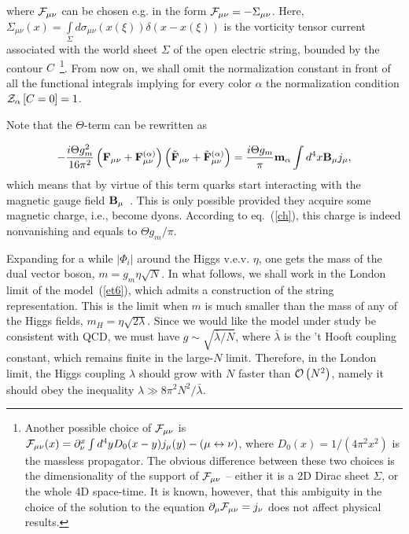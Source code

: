 \documentclass[a4paper,12pt]{article}
\begin{document}
where ${\cal F}_{\mu\nu}$ can be chosen e.g. in the form
${\cal F}_{\mu\nu}=-\Sigma_{\mu\nu}$.
Here, $\Sigma_{\mu\nu}(x)=\int\limits_{\Sigma}^{}d\sigma_{\mu\nu}
(x(\xi))\delta(x-x(\xi))$ is the vorticity tensor current associated
with the world sheet $\Sigma$ of
the open electric string, bounded by the contour $C$~\footnote{Another possible choice of ${\cal F}_{\mu\nu}$
is ${\cal F}_{\mu\nu}(x)=\partial_\nu^x\int d^4yD_0(x-y)j_\mu(y)-(\mu\leftrightarrow\nu)$, where $D_0(x)=1/(4\pi^2x^2)$
is the massless propagator. The obvious difference between these two choices is the dimensionality of the support
of ${\cal F}_{\mu\nu}$ -- either it is a 2D Dirac sheet $\Sigma$, or the whole 4D space-time.
It is known, however, that this ambiguity in the choice of the solution to the equation $\partial_\mu{\cal F}_{\mu\nu}=j_\nu$
does not affect physical results.}.
From now on, we shall omit the normalization constant in front of
all the functional integrals implying for every color $\alpha$ the normalization condition
${\cal Z}_\alpha\left[C=0\right]=1$.

Note that the $\Theta$-term can be rewritten as

\begin{equation}
\label{ch}
-\frac{i\Theta g_m^2}{16\pi^2}
\left({\bf F}_{\mu\nu}+{\bf F}_{\mu\nu}^{(\alpha)}\right)
\left(\tilde{\bf F}_{\mu\nu}+\tilde{\bf F}_{\mu\nu}^{(\alpha)}\right)=\frac{i\Theta g_m}{\pi}{\bf m}_\alpha
\int d^4x{\bf B}_\mu j_\mu,
\end{equation}
which means that by virtue of this term quarks start interacting with the magnetic gauge field ${\bf B}_\mu$~\cite{witten}.
This is only possible provided they
acquire some magnetic charge, i.e., become dyons. According to eq.~(\ref{ch}), this charge is indeed nonvanishing and
equals to $\Theta g_m/\pi$.



Expanding for a while $|\Phi_i|$ around the Higgs v.e.v. $\eta$, one gets the mass of the dual vector boson,
$m=g_m\eta\sqrt{N}$. In what follows, we shall work in the London limit of the model~(\ref{et6}),
which admits a construction of the string representation. This is the limit when $m$ is much smaller
than the mass of any of the Higgs fields, $m_H=\eta\sqrt{2\lambda}$. Since we would like
the model under study be consistent with QCD, we must have $g\sim\sqrt{\bar\lambda/N}$, where $\bar\lambda$
is the 't Hooft coupling constant, which remains finite in the large-$N$ limit. Therefore, in the London limit,
the Higgs coupling $\lambda$ should grow with $N$ faster than ${\cal O}\left(N^2\right)$, namely it should obey the
inequality $\lambda\gg 8\pi^2N^2/\bar\lambda$.
\end{document}
